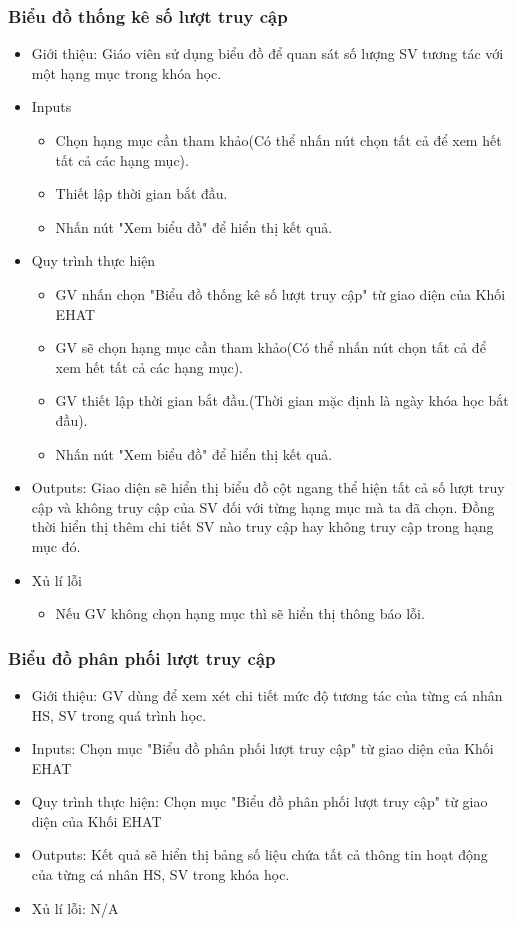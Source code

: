 \subsubsection{Biểu đồ thống kê số lượt truy cập}
\begin{itemize}
	\item Giới thiệu: Giáo viên sử dụng biểu đồ để quan sát số lượng SV tương tác với một hạng mục trong khóa học.
	\item Inputs
	\begin{itemize}
		\item Chọn hạng mục cần tham khảo(Có thể nhấn nút chọn tất cả để xem hết tất cả các hạng mục).
		\item Thiết lập thời gian bắt đầu.
		\item Nhấn nút "Xem biểu đồ" để hiển thị kết quả.
	\end{itemize}
	\item Quy trình thực hiện
	\begin{itemize}
		\item GV nhấn chọn "Biểu đồ thống kê số lượt truy cập" từ giao diện của Khối EHAT
		\item GV sẽ chọn hạng mục cần tham khảo(Có thể nhấn nút chọn tất cả để xem hết tất cả các hạng mục).
		\item GV thiết lập thời gian bắt đầu.(Thời gian mặc định là ngày khóa học bắt đầu).
		\item Nhấn nút "Xem biểu đồ" để hiển thị kết quả.
	\end{itemize}
	\item Outputs: Giao diện sẽ hiển thị biểu đồ cột ngang thể hiện tất cả số lượt truy cập và không truy cập của SV đối với từng hạng mục mà ta đã chọn. Đồng thời hiển thị thêm chi tiết SV nào truy cập hay không truy cập trong hạng mục đó.
	\item Xủ lí lỗi
	\begin{itemize}
		\item Nếu GV không chọn hạng mục thì sẽ hiển thị thông báo lỗi.
	\end{itemize}
\end{itemize}
\subsubsection{Biểu đồ phân phối lượt truy cập}
\begin{itemize}
	\item Giới thiệu: GV dùng để xem xét chi tiết mức độ tương tác của từng cá nhân HS, SV trong quá trình học.
	\item Inputs: Chọn mục "Biểu đồ phân phối lượt truy cập" từ giao diện của Khối EHAT
	\item Quy trình thực hiện: Chọn mục "Biểu đồ phân phối lượt truy cập" từ giao diện của Khối EHAT
	\item Outputs: Kết quả sẽ hiển thị bảng số liệu chứa tất cả thông tin hoạt động của từng cá nhân HS, SV trong khóa học.
	\item Xủ lí lỗi: N/A
\end{itemize}
